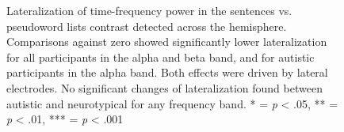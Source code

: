\begin{figure}[!ht]
	\centering
	\caption{Lateralization of time-frequency power in the sentences vs. pseudoword lists contrast detected across the hemisphere. Comparisons against zero showed significantly lower lateralization for all participants in the alpha and beta band, and for autistic participants in the alpha band. Both effects were driven by lateral electrodes. No significant changes of lateralization found between autistic and neurotypical for any frequency band. * = \textit{p} < .05, ** = \textit{p} < .01, *** = \textit{p} < .001}
    \vspace*{5pt}
	\label{fig:laterality-topo}
\end{figure}


